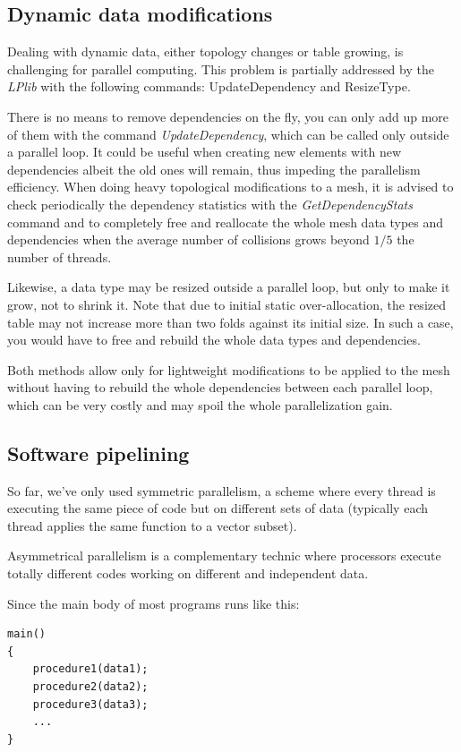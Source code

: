\documentclass[a4paper,12pt]{article}
\begin{document}
\subsection{Dynamic data modifications}

Dealing with dynamic data, either topology changes or table growing, is challenging for parallel computing. This problem is partially addressed by the \emph{LPlib} with the following commands: UpdateDependency and ResizeType.

There is no means to remove dependencies on the fly, you can only add up more of them with the command \emph{UpdateDependency}, which can be called only outside a parallel loop. It could be useful when creating new elements with new dependencies albeit the old ones will remain, thus impeding the parallelism efficiency. When doing heavy topological modifications to a mesh, it is advised to check periodically the dependency statistics with the \emph{GetDependencyStats} command and to completely free and reallocate the whole mesh data types and dependencies when the average number of collisions grows beyond $1/5$ the number of threads.

Likewise, a data type may be resized outside a parallel loop, but only to make it grow, not to shrink it. Note that due to initial static over-allocation, the resized table may not increase more than two folds against its initial size. In such a case, you would have to free and rebuild the whole data types and dependencies.

Both methods allow only for lightweight modifications to be applied to the mesh without having to rebuild the whole dependencies between each parallel loop, which can be very costly and may spoil the whole parallelization gain.


\subsection{Software pipelining}

So far, we've only used symmetric parallelism, a scheme where every thread is executing the same piece of code but on different sets of data (typically each thread applies the same function to a vector subset).

Asymmetrical parallelism is a complementary technic where processors execute totally different codes working on different and independent data.

Since the main body of most programs runs like this:

\begin{tt}
\begin{verbatim}
main()
{
    procedure1(data1);
    procedure2(data2);
    procedure3(data3);
    ...
}
\end{verbatim}
\end{tt}
\normalfont
\end{document}
